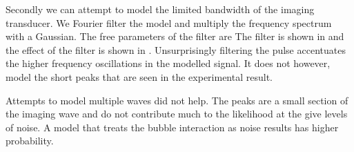 

Secondly we can attempt to  model the limited bandwidth of the imaging transducer.
We Fourier filter the model and multiply the frequency spectrum with a Gaussian.
The free parameters of the filter are
The filter is shown in  and the effect of the filter is shown in .
Unsurprisingly filtering the pulse accentuates the higher frequency oscillations in the modelled signal.
It does not however, 
model the short peaks that are seen in the experimental result.

%

Attempts to model multiple waves did not help.
The peaks are a small section of the imaging wave 
and do not contribute much to the likelihood at the give levels of noise.
A model that treats the bubble interaction as noise results has higher probability.




